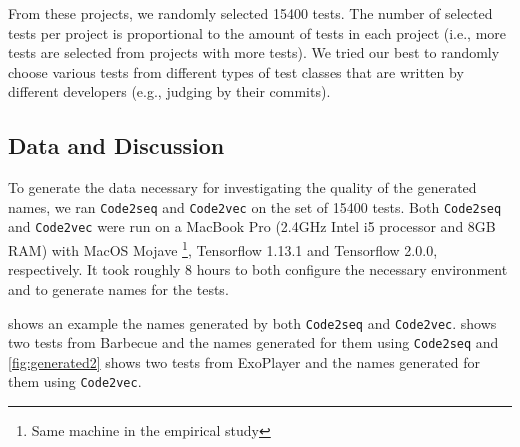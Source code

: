 \begin{appendices}
From these projects, we randomly selected \num{15400} tests.
%
The number of selected tests per project is proportional to the amount of tests in each project (i.e., more tests are selected from projects with more tests).
%
We tried our best to randomly choose various tests from different types of test classes that are written by different developers (e.g., judging by their commits).


\subsection{Data and Discussion}

To generate the data necessary for investigating the quality of the generated names, we ran \texttt{Code2seq} and \texttt{Code2vec} on the set of \num{15400} tests.
%
Both \texttt{Code2seq} and \texttt{Code2vec} were run on a MacBook Pro (2.4GHz Intel i5 processor and 8GB RAM) with MacOS Mojave \footnote{Same machine in the empirical study}, Tensorflow 1.13.1 and Tensorflow 2.0.0, respectively.
%
It took roughly \num{8} hours to both configure the necessary environment and to generate names for the tests.


 shows an example the names generated by both \texttt{Code2seq} and \texttt{Code2vec}.
%
 shows two tests from Barbecue and the names generated for them using \texttt{Code2seq} and \cref{fig:generated2} shows two tests from ExoPlayer and the names generated for them using \texttt{Code2vec}.



\end{appendices}
